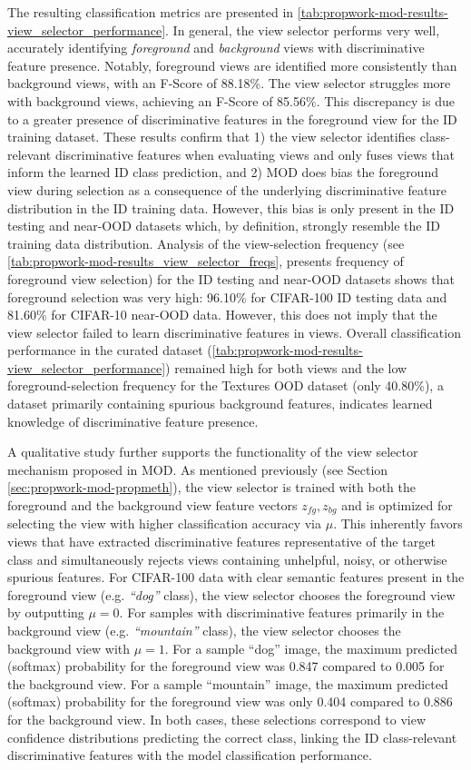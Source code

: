 The resulting classification metrics are presented in  \ref{tab:propwork-mod-results-view_selector_performance}. In general, the view selector performs very well, accurately identifying \textit{foreground} and \textit{background} views with discriminative feature presence. Notably, foreground views are identified more consistently than background views, with an F-Score of 88.18\%. The view selector struggles more with background views, achieving an F-Score of 85.56\%. This discrepancy is due to a greater presence of discriminative features in the foreground view for the ID training dataset. These results confirm that 1) the view selector identifies class-relevant discriminative features when evaluating views and only fuses views that inform the learned ID class prediction, and 2) MOD does bias the foreground view during selection as a consequence of the underlying discriminative feature distribution in the ID training data. However, this bias is only present in the ID testing and near-OOD datasets which, by definition, strongly resemble the ID training data distribution. Analysis of the view-selection frequency (see  \ref{tab:propwork-mod-results_view_selector_freqs}, presents frequency of foreground view selection) for the ID testing and near-OOD datasets shows that foreground selection was very high: 96.10\% for CIFAR-100 ID testing data and 81.60\% for CIFAR-10 near-OOD data. However, this does not imply that the view selector failed to learn discriminative features in views. Overall classification performance in the curated dataset (\ref{tab:propwork-mod-results-view_selector_performance}) remained high for both views and the low foreground-selection frequency for the Textures OOD dataset (only 40.80\%), a dataset primarily containing spurious background features, indicates learned knowledge of discriminative feature presence.

A qualitative study further supports the functionality of the view selector mechanism proposed in MOD. As mentioned previously (see Section \ref{sec:propwork-mod-propmeth}), the view selector is trained with both the foreground and the background view feature vectors $z_{fg}, z_{bg}$ and is optimized for selecting the view with higher classification accuracy via $\mu$. This inherently favors views that have extracted discriminative features representative of the target class and simultaneously rejects views containing unhelpful, noisy, or otherwise spurious features. 
For CIFAR-100 data with clear semantic features present in the foreground view (e.g. \textit{``dog''} class), the view selector chooses the foreground view by outputting $\mu = 0$. For samples with discriminative features primarily in the background view (e.g. \textit{``mountain''} class), the view selector chooses the background view with $\mu = 1$. For a sample ``dog'' image, the maximum predicted (softmax) probability for the foreground view was 0.847 compared to 0.005 for the background view. For a sample ``mountain'' image, the maximum predicted (softmax) probability for the foreground view was only 0.404 compared to 0.886 for the background view. In both cases, these selections correspond to view confidence distributions predicting the correct class, linking the ID class-relevant discriminative features with the model classification performance.

